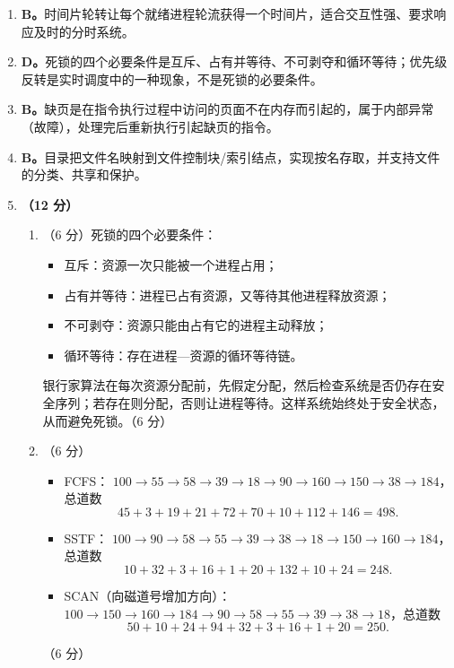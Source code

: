\documentclass[a4paper,11pt]{article}
\begin{document}
\begin{enumerate}[start=8, label=\textbf{\arabic*.}, leftmargin=2.4em, itemsep=0.45em]

\item \textbf{B。}时间片轮转让每个就绪进程轮流获得一个时间片，适合交互性强、要求响应及时的分时系统。

\item \textbf{D。}死锁的四个必要条件是互斥、占有并等待、不可剥夺和循环等待；优先级反转是实时调度中的一种现象，不是死锁的必要条件。

\item \textbf{B。}缺页是在指令执行过程中访问的页面不在内存而引起的，属于内部异常（故障），处理完后重新执行引起缺页的指令。

\item \textbf{B。}目录把文件名映射到文件控制块/索引结点，实现按名存取，并支持文件的分类、共享和保护。

\item \textbf{（12 分）}
\begin{enumerate}[label=（\arabic*）, leftmargin=2.2em, itemsep=2pt]
  \item （6 分）死锁的四个必要条件：
  \begin{itemize}[leftmargin=1.8em, itemsep=1pt]
    \item 互斥：资源一次只能被一个进程占用；
    \item 占有并等待：进程已占有资源，又等待其他进程释放资源；
    \item 不可剥夺：资源只能由占有它的进程主动释放；
    \item 循环等待：存在进程—资源的循环等待链。
  \end{itemize}
  银行家算法在每次资源分配前，先假定分配，然后检查系统是否仍存在安全序列；若存在则分配，否则让进程等待。这样系统始终处于安全状态，从而避免死锁。\hfill（6 分）

  \item （6 分）
  \begin{itemize}[leftmargin=1.8em, itemsep=1pt]
    \item FCFS：
    $100\to55\to58\to39\to18\to90\to160\to150\to38\to184$，总道数
    \[
    45+3+19+21+72+70+10+112+146=498.
    \]
    \item SSTF：
    $100\to90\to58\to55\to39\to38\to18\to150\to160\to184$，总道数
    \[
    10+32+3+16+1+20+132+10+24=248.
    \]
    \item SCAN（向磁道号增加方向）：
    $100\to150\to160\to184\to90\to58\to55\to39\to38\to18$，总道数
    \[
    50+10+24+94+32+3+16+1+20=250.
    \]
  \end{itemize}
  \hfill（6 分）
\end{enumerate}

\end{enumerate}
\end{document}
